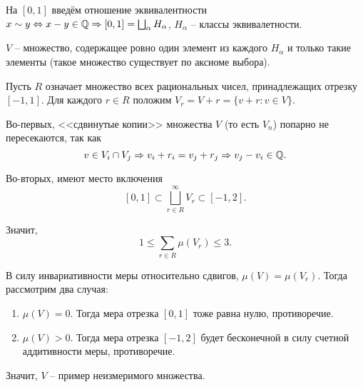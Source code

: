 \begin{example}
    На $[0, 1]$ введём отношение эквивалентности $x \sim y \Leftrightarrow x - y \in \mathbb{Q} \Rightarrow [0, 1] = \bigsqcup_{\alpha}H_{\alpha}$, $H_{\alpha}$ -- классы эквивалетности.

    $V$ -- множество, содержащее ровно один элемент из каждого $H_{\alpha}$ и только такие элементы (такое множество существует по аксиоме выбора).

        
        

        

    Пусть $R$ означает множество всех рациональных чисел, принадлежащих отрезку $[-1, 1]$. Для каждого $r \in R$ положим $V_{r} = V + r = \{v + r : v \in V\}$. 

    Во-первых, <<сдвинутые копии>> множества $V$ (то есть $V_{n}$) попарно не пересекаются, так как
    \[v \in V_{i} \cap V_{j} \Rightarrow v_{i} + r_{i} = v_{j} + r_{j} \Rightarrow v_{j} - v_{i} \in \mathbb{Q}.\]

    Во-вторых, имеют место включения
    \[[0, 1] \subset \bigsqcup_{r \in R}^{\infty}V_{r} \subset [-1, 2].\]

    Значит, 
    \[1 \leq \sum_{r \in R}\mu(V_{r}) \leq 3.\]

    В силу инвариативности меры относительно сдвигов, $\mu(V) = \mu(V_r)$. Тогда рассмотрим два случая:
    \begin{enumerate}
        \item $\mu(V) = 0$. Тогда мера отрезка $[0, 1]$ тоже равна нулю, противоречие.
        \item $\mu(V) > 0$. Тогда мера отрезка $[-1, 2]$ будет бесконечной в силу счетной аддитивности меры, противоречие.
    \end{enumerate}

    Значит, $V$ -- пример неизмеримого множества.
\end{example}
